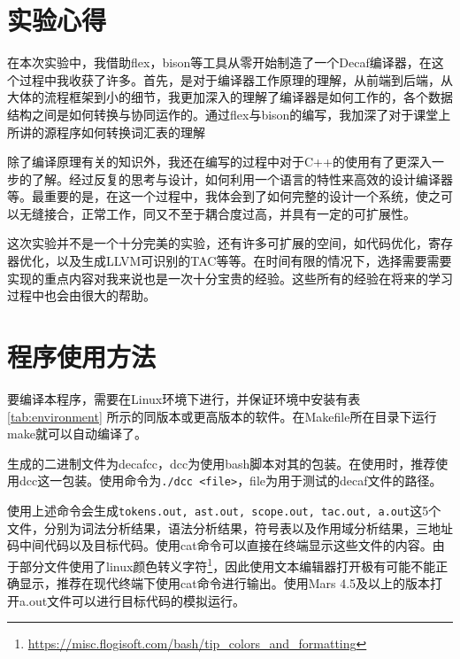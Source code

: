 \documentclass{report}
\begin{document}
\chapter{实验心得}
\label{cha:shi_yan_xin_de_}
\par 在本次实验中，我借助flex，bison等工具从零开始制造了一个Decaf编译器，在这个过程中我收获了许多。首先，是对于编译器工作原理的理解，从前端到后端，从大体的流程框架到小的细节，我更加深入的理解了编译器是如何工作的，各个数据结构之间是如何转换与协同运作的。通过flex与bison的编写，我加深了对于课堂上所讲的源程序如何转换词汇表的理解
\par 除了编译原理有关的知识外，我还在编写的过程中对于C++的使用有了更深入一步的了解。经过反复的思考与设计，如何利用一个语言的特性来高效的设计编译器等。最重要的是，在这一个过程中，我体会到了如何完整的设计一个系统，使之可以无缝接合，正常工作，同又不至于耦合度过高，并具有一定的可扩展性。
\par 这次实验并不是一个十分完美的实验，还有许多可扩展的空间，如代码优化，寄存器优化，以及生成LLVM可识别的TAC等等。在时间有限的情况下，选择需要需要实现的重点内容对我来说也是一次十分宝贵的经验。这些所有的经验在将来的学习过程中也会由很大的帮助。

\appendix
{\let\clearpage\relax \chapter{程序使用方法}}
\label{cha:cheng_xu_shi_yong_fang_fa_}
\par 要编译本程序，需要在Linux环境下进行，并保证环境中安装有表\ref{tab:environment} 所示的同版本或更高版本的软件。在Makefile所在目录下运行make就可以自动编译了。
\par 生成的二进制文件为decafcc，dcc为使用bash脚本对其的包装。在使用时，推荐使用dcc这一包装。使用命令为\lstinline|./dcc <file>|，file为用于测试的decaf文件的路径。
\par 使用上述命令会生成\lstinline|tokens.out, ast.out, scope.out, tac.out, a.out|这5个文件，分别为词法分析结果，语法分析结果，符号表以及作用域分析结果，三地址码中间代码以及目标代码。使用cat命令可以直接在终端显示这些文件的内容。由于部分文件使用了linux颜色转义字符\footnote{\url{https://misc.flogisoft.com/bash/tip_colors_and_formatting}}，因此使用文本编辑器打开极有可能不能正确显示，推荐在现代终端下使用cat命令进行输出。使用Mars 4.5及以上的版本打开a.out文件可以进行目标代码的模拟运行。
\end{document}
